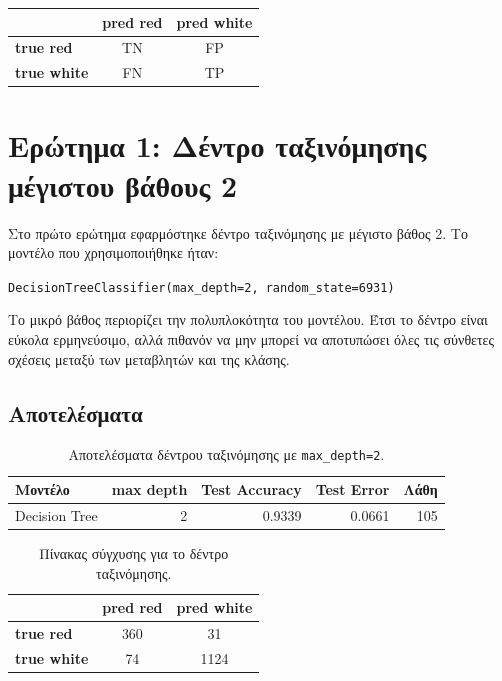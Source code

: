 \documentclass[12pt,a4paper]{article}
\newcommand{\code}[1]{\texttt{\textenglish{#1}}}
\begin{document}
\begin{center}
\begin{tabular}{lcc}
\toprule
& \textbf{pred red} & \textbf{pred white} \\
\midrule
\textbf{true red} & TN & FP \\
\textbf{true white} & FN & TP \\
\bottomrule
\end{tabular}
\end{center}

\section{Ερώτημα 1: Δέντρο ταξινόμησης μέγιστου βάθους 2}

Στο πρώτο ερώτημα εφαρμόστηκε δέντρο ταξινόμησης με μέγιστο βάθος 2. Το μοντέλο
που χρησιμοποιήθηκε ήταν:

\begin{center}
\small
\code{DecisionTreeClassifier(max\_depth=2, random\_state=6931)}
\end{center}

Το μικρό βάθος περιορίζει την πολυπλοκότητα του μοντέλου. Έτσι το δέντρο είναι
εύκολα ερμηνεύσιμο, αλλά πιθανόν να μην μπορεί να αποτυπώσει όλες τις
σύνθετες σχέσεις μεταξύ των μεταβλητών και της κλάσης.

\subsection{Αποτελέσματα}

\begin{table}[H]
\centering
\caption{Αποτελέσματα δέντρου ταξινόμησης με \code{max\_depth=2}.}
\begin{tabular}{lrrrr}
\toprule
\textbf{Μοντέλο} & \textbf{max depth} & \textbf{Test Accuracy} & \textbf{Test Error} & \textbf{Λάθη} \\
\midrule
Decision Tree & 2 & 0.9339 & 0.0661 & 105 \\
\bottomrule
\end{tabular}
\end{table}

\begin{table}[H]
\centering
\caption{Πίνακας σύγχυσης για το δέντρο ταξινόμησης.}
\begin{tabular}{lcc}
\toprule
& \textbf{pred red} & \textbf{pred white} \\
\midrule
\textbf{true red}   & 360 & 31 \\
\textbf{true white} & 74  & 1124 \\
\bottomrule
\end{tabular}
\end{table}
\end{document}

